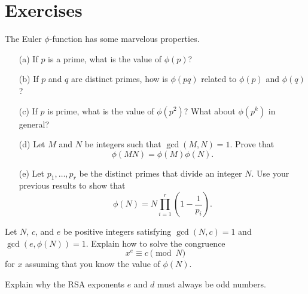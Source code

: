 \documentclass{article}
\begin{document}
\section{Exercises}

    \begin{exercise}
        The Euler \(\phi\)-function has some marvelous properties.
        \begin{enumerate}
            \item[(a)] If \(p\) is a prime, what is the value of \(\phi(p)\)?
            \item[(b)] If \(p\) and \(q\) are distinct primes, how is \(\phi(pq)\) related to \(\phi(p)\) and \(\phi(q)\)?
            \item[(c)] If \(p\) is prime, what is the value of \(\phi(p^2)\)?
            What about \(\phi(p^k)\) in general?
            \item[(d)] Let \(M\) and \(N\) be integers such that \(\gcd(M,N)=1\).
            Prove that
            \[\phi(MN) = \phi(M)\phi(N).\]
            \item[(e)] Let \(p_1,\ldots,p_r\) be the distinct primes that divide an integer \(N\). 
            Use your previous results to show that 
            \[\phi(N) = N\prod_{i=1}^r\left(1-\frac{1}{p_i}\right).\]
        \end{enumerate}
    \end{exercise}
    \iffalse
    Solution:
    Most of these computations are straightforward.
    \fi

    \begin{exercise}
        Let \(N\), \(c\), and \(e\) be positive integers satisfying \(\gcd(N,c)=1\) and \(\gcd(e,\phi(N))=1\).
        Explain how to solve the congruence
        \[x^e \equiv c\pmod{N}\]
        for \(x\) assuming that you know the value of \(\phi(N)\).
    \end{exercise}
    \iffalse
    Solution:
    By Bezout's lemma there exists \(a,b\) such that \(ae+b\phi(N)=1\).
    Now,
    \[x=x^{ae+b\phi(N)}\equiv \left(x^e\right)^a\left(x^{\phi(N)}\right)^b\equiv c^a\pmod{N}\]
    by Euler's theorem.
    \fi

    \begin{exercise}
        Explain why the RSA exponents \(e\) and \(d\) must always be odd numbers.
    \end{exercise}
    \iffalse
    Solution:
    By definition, \(\gcd(e,(p-1)(q-1))=1\).
    Since \((p-1)(q-1)\) is even, \(e\) must be odd.
    Also, the equation
    \[1 = ed + k(p-1)(q-1)\]
    holds for some \(k\in\ZZ\).
    Since \((p-1)(q-1)\) is even and \(e\) is odd, \(d\) cannot be even (otherwise the sum on the right would be even).
    \fi
\end{document}
